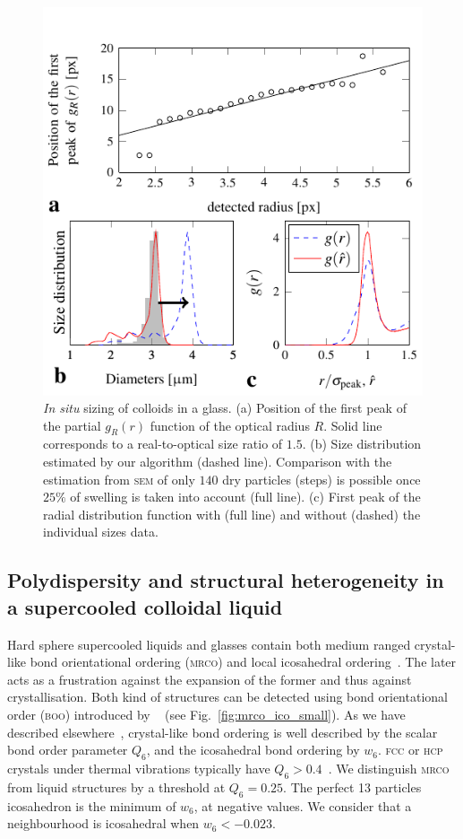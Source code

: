 \documentclass[8.5pt,twoside,twocolumn]{article}
\begin{document}
\begin{figure}[h]
\centering
\includegraphics{fig_sizing.pdf}
	\caption{\emph{In situ} sizing of colloids in a glass. (a) Position of the first peak of the partial $g_R(r)$ function of the optical radius $R$. Solid line corresponds to a real-to-optical size ratio of $1.5$. (b) Size distribution estimated by our algorithm (dashed line). Comparison with the estimation from \textsc{sem} of only $140$ dry particles (steps) is possible once $25\%$ of swelling is taken into account (full line). (c) First peak of the radial distribution function with (full line) and without (dashed) the individual sizes data.}
	\label{fig:sizing}
\end{figure}

\subsection{Polydispersity and structural heterogeneity in a supercooled colloidal liquid}


Hard sphere supercooled liquids and glasses contain both medium ranged crystal-like bond orientational ordering (\textsc{mrco}) and local icosahedral ordering~\cite{Leocmach2012}. The later acts as a frustration against the expansion of the former and thus against crystallisation. Both kind of structures can be detected using bond orientational order (\textsc{boo}) introduced by ~\citet{steinhardt1983boo} (see Fig.~\ref{fig:mrco_ico_small}). As we have described elsewhere~\cite{Leocmach2012}, crystal-like bond ordering is well described by the scalar bond order parameter $Q_6$, and the icosahedral bond ordering by $w_6$. \textsc{fcc} or \textsc{hcp} crystals under thermal vibrations typically have $Q_6>0.4$~\cite{Lechner2008}. We distinguish \textsc{mrco} from liquid structures by a threshold at $Q_6=0.25$. The perfect 13 particles icosahedron is the minimum of $w_6$, at negative values. We consider that a neighbourhood is icosahedral when $w_6<-0.023$.
\end{document}
